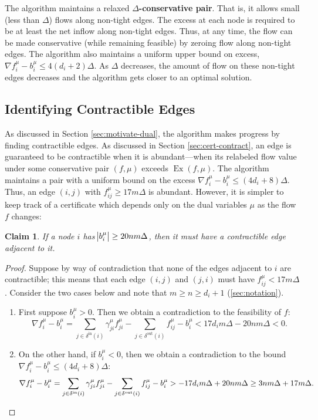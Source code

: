 \documentclass[11pt]{article}
\newtheorem{claim}[theorem]{Claim}
\theoremstyle{definition}
\theoremstyle{definition}
\theoremstyle{definition}
\newcommand{\fu}{f^{\mu}}
\newcommand{\nfiu}{\nabla \fu_i}
\newcommand{\biu}{b_{i}^{\mu}}
\newcommand{\din}{\delta^{\text{in}}}
\newcommand{\dout}{\delta^{\text{out}}}
\DeclareMathOperator{\Ex}{Ex}
\begin{document}
The algorithm maintains a relaxed \textbf{$\Delta$-conservative pair}.
That is, it allows small (less than $\Delta$) flows along non-tight edges.
The excess at each node is required to be at least the
net inflow along non-tight edges. Thus, at any time, the flow can be made conservative
(while remaining feasible) by zeroing flow along non-tight edges.
The algorithm also maintains a uniform upper bound on excess,
$\nfiu - \biu \leq 4(d_i + 2)\Delta$. As $\Delta$ decreases, the amount of flow on these non-tight
edges decreases and the algorithm gets closer to an optimal solution.

\subsection{Identifying Contractible Edges}
\label{sec:findcontr2013}
As discussed in Section \ref{sec:motivate-dual},
the algorithm makes progress by finding contractible edges.
As discussed in Section \ref{sec:cert-contract}, an edge is guaranteed
to be contractible when it is abundant---when its relabeled flow value
under some conservative pair $(f, \mu)$
exceeds $\Ex(f, \mu)$. The algorithm maintains a pair with
a uniform bound on the excess $\nfiu - \biu \leq (4d_i + 8)\Delta$.
Thus, an edge $(i, j)$ with $f_{ij}^\mu \geq 17m\Delta$ is abundant.
However, it is simpler to keep track of a certificate which depends only
on the dual variables $\mu$ as the flow $f$ changes:
\begin{claim}
If a node $i$ has $\abs{b_i^\mu} \geq 20nm\Delta$, then it must
have a contractible edge adjacent to it.
\end{claim}
\begin{proof}
Suppose by way of contradiction that none of the edges adjacent to $i$ are
contractible; this means that each edge $(i,j)$ and $(j,i)$ must have $f_{ij}^\mu < 17m\Delta$.
Consider the two cases below and note that $m \geq n \geq d_i + 1$ (\ref{sec:notation}).
\begin{enumerate}[itemsep=0mm]
\item First suppose $b_i^\mu > 0$. Then we obtain a contradiction to the feasibility of $f$:
      \[ \nfiu - \biu = \sum_{j \in \din(i)} \gamma_{ji}^\mu f_{ji}^\mu -
	  \sum_{j \in \dout(i)} f_{ij}^\mu - b_i^\mu < 17d_im\Delta - 20nm\Delta < 0. \]
\item On the other hand, if $b_i^\mu < 0$, then we obtain a contradiction to the
      bound $\nfiu - \biu \leq (4d_i + 8)\Delta$:
	  \[ \nfiu - \biu = \sum_{j \in \din(i)} \gamma_{ji}^\mu f_{ji}^\mu -
		 \sum_{j \in \dout(i)} f_{ij}^\mu - b_i^\mu
         > -17d_im\Delta + 20nm\Delta \geq 3nm\Delta + 17m\Delta. \qedhere \]
\end{enumerate}
\end{proof}
\end{document}
